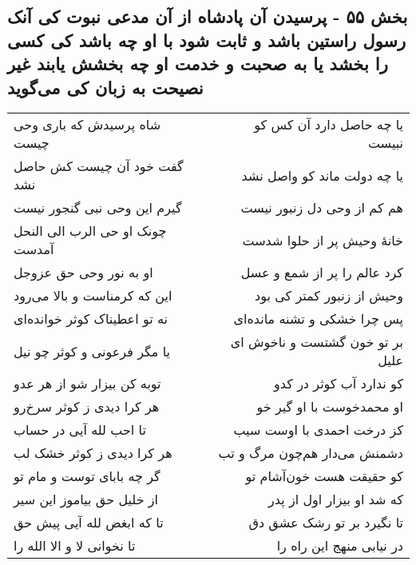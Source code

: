 \begin{center}
\section*{بخش ۵۵ - پرسیدن آن پادشاه از آن مدعی نبوت کی آنک رسول راستین باشد و ثابت شود با او چه باشد کی کسی را بخشد یا به صحبت و خدمت او چه بخشش یابند غیر نصیحت به زبان کی می‌گوید}
\label{sec:sh055}
\begin{longtable}{l p{0.5cm} r}
شاه پرسیدش که باری وحی چیست
&&
یا چه حاصل دارد آن کس کو نبیست
\\
گفت خود آن چیست کش حاصل نشد
&&
یا چه دولت ماند کو واصل نشد
\\
گیرم این وحی نبی گنجور نیست
&&
هم کم از وحی دل زنبور نیست
\\
چونک او حی الرب الی النحل آمدست
&&
خانهٔ وحیش پر از حلوا شدست
\\
او به نور وحی حق عزوجل
&&
کرد عالم را پر از شمع و عسل
\\
این که کرمناست و بالا می‌رود
&&
وحیش از زنبور کمتر کی بود
\\
نه تو اعطیناک کوثر خوانده‌ای
&&
پس چرا خشکی و تشنه مانده‌ای
\\
یا مگر فرعونی و کوثر چو نیل
&&
بر تو خون گشتست و ناخوش ای علیل
\\
توبه کن بیزار شو از هر عدو
&&
کو ندارد آب کوثر در کدو
\\
هر کرا دیدی ز کوثر سرخ‌رو
&&
او محمدخوست با او گیر خو
\\
تا احب لله آیی در حساب
&&
کز درخت احمدی با اوست سیب
\\
هر کرا دیدی ز کوثر خشک لب
&&
دشمنش می‌دار هم‌چون مرگ و تب
\\
گر چه بابای توست و مام تو
&&
کو حقیقت هست خون‌آشام تو
\\
از خلیل حق بیاموز این سیر
&&
که شد او بیزار اول از پدر
\\
تا که ابغض لله آیی پیش حق
&&
تا نگیرد بر تو رشک عشق دق
\\
تا نخوانی لا و الا الله را
&&
در نیابی منهج این راه را
\\
\end{longtable}
\end{center}
